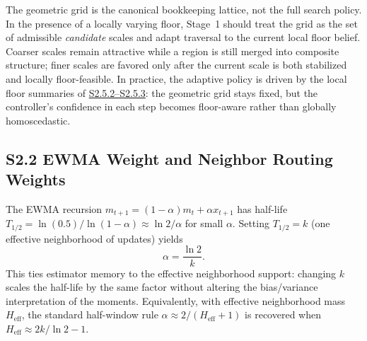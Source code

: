 \documentclass[11pt]{article}
\newcommand{\Heff}{H_{\mathrm{eff}}}
\begin{document}
The geometric grid is the canonical bookkeeping lattice, not the full search
policy. In the presence of a locally varying floor, Stage~1 should treat the
grid as the set of admissible \emph{candidate} scales and adapt traversal to
the current local floor belief. Coarser scales remain attractive while a region
is still merged into composite structure; finer scales are favored only after
the current scale is both stabilized and locally floor-feasible. In practice,
the adaptive policy is driven by the local floor summaries of
\hyperref[sec:si-local-noise]{S2.5.2--S2.5.3}: the geometric grid stays fixed,
but the controller's confidence in each step becomes floor-aware rather than
globally homoscedastic.

\subsection*{S2.2 EWMA Weight and Neighbor Routing Weights}
\label{sec:si-neighbor-weights}
The EWMA recursion $m_{t+1}=(1-\alpha)m_t+\alpha x_{t+1}$ has half-life $T_{1/2}=\ln(0.5)/\ln(1-\alpha)\approx \ln 2/\alpha$ for small $\alpha$. Setting $T_{1/2}=k$ (one effective neighborhood of updates) yields
\[
\alpha=\frac{\ln 2}{k}.
\]
This ties estimator memory to the effective neighborhood support: changing $k$ scales the half-life by the same factor without altering the bias/variance interpretation of the moments. Equivalently, with effective neighborhood mass $\Heff$, the standard half-window rule $\alpha\approx 2/(\Heff+1)$ is recovered when $\Heff\approx 2k/\ln 2-1$.
\end{document}
